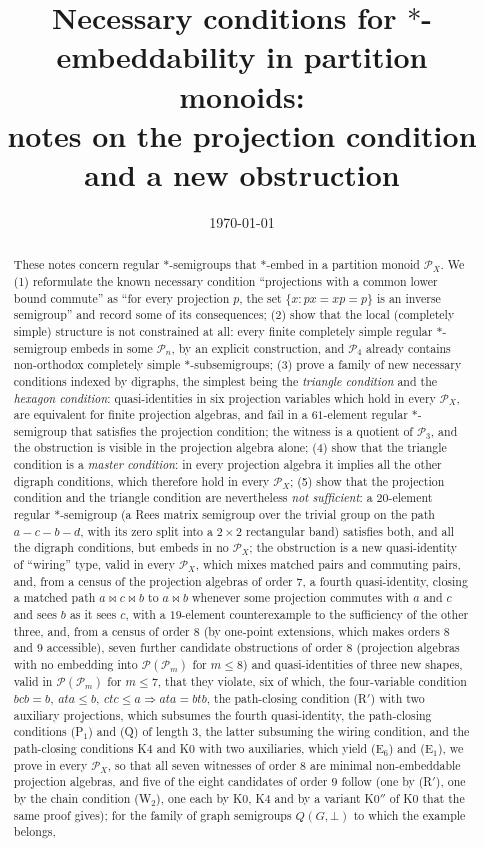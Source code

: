 \documentclass[11pt]{amsart}
\title[Embeddability in partition monoids]{Necessary conditions for $*$-embeddability in partition monoids:\\ notes on the projection condition and a new obstruction}
\date{\today}
\theoremstyle{definition}
\renewcommand{\P}{\mathcal{P}}
\newcommand{\mt}{\bowtie}   %
\begin{document}
\maketitle

\begin{abstract}
These notes concern regular $*$-semigroups that $*$-embed in a partition monoid $\P_X$. We (1) reformulate the known necessary condition ``projections with a common lower bound commute'' as ``for every projection $p$, the set $\{x : px=xp=p\}$ is an inverse semigroup'' and record some of its consequences; (2) show that the local (completely simple) structure is not constrained at all: every finite completely simple regular $*$-semigroup embeds in some $\P_n$, by an explicit construction, and $\P_4$ already contains non-orthodox completely simple $*$-subsemigroups; (3) prove a family of new necessary conditions indexed by digraphs, the simplest being the \emph{triangle condition} and the \emph{hexagon condition}: quasi-identities in six projection variables which hold in every $\P_X$, are equivalent for finite projection algebras, and fail in a $61$-element regular $*$-semigroup that satisfies the projection condition; the witness is a quotient of $\P_3$, and the obstruction is visible in the projection algebra alone; (4) show that the triangle condition is a \emph{master condition}: in every projection algebra it implies all the other digraph conditions, which therefore hold in every $\P_X$; (5) show that the projection condition and the triangle condition are nevertheless \emph{not sufficient}: a $20$-element regular $*$-semigroup (a Rees matrix semigroup over the trivial group on the path $a-c-b-d$, with its zero split into a $2\times2$ rectangular band) satisfies both, and all the digraph conditions, but embeds in no $\P_X$; the obstruction is a new quasi-identity of ``wiring'' type, valid in every $\P_X$, which mixes matched pairs and commuting pairs, and, from a census of the projection algebras of order $7$, a fourth quasi-identity, closing a matched path $a\mt c\mt b$ to $a\mt b$ whenever some projection commutes with $a$ and $c$ and sees $b$ as it sees $c$, with a $19$-element counterexample to the sufficiency of the other three, and, from a census of order $8$ (by one-point extensions, which makes orders $8$ and $9$ accessible), seven further candidate obstructions of order $8$ (projection algebras with no embedding into $\P(\P_m)$ for $m\le8$) and quasi-identities of three new shapes, valid in $\P(\P_m)$ for $m\le7$, that they violate, six of which, the four-variable condition $bcb=b,\ ata\le b,\ ctc\le a\Rightarrow ata=btb$, the path-closing condition (R$'$) with two auxiliary projections, which subsumes the fourth quasi-identity, the path-closing conditions (P$_1$) and (Q) of length $3$, the latter subsuming the wiring condition, and the path-closing conditions K4 and K0 with two auxiliaries, which yield (E$_6$) and (E$_1$), we prove in every $\P_X$, so that all seven witnesses of order $8$ are minimal non-embeddable projection algebras, and five of the eight candidates of order $9$ follow (one by (R$'$), one by the chain condition (W$_2$), one each by K0, K4 and by a variant K0$''$ of K0 that the same proof gives); for the family of graph semigroups $Q(G,\bot)$ to which the example belongs, 
\end{abstract}
\end{document}
